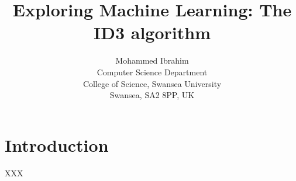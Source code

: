 \documentclass{article}
\begin{document}
\title{Exploring Machine Learning: The ID3 algorithm}

\author{Mohammed Ibrahim\\
 Computer Science Department\\
  College of Science, Swansea University\\
  Swansea, SA2 8PP, UK
}

\maketitle

\tableofcontents

\section{Introduction}

XXX
\end{document}
